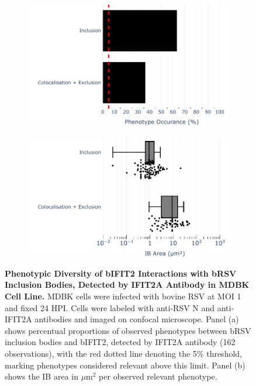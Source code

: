 \begin{figure}
    \begin{subfigure}{0.495\textwidth}
        \caption{}
        \includegraphics[width=1\linewidth]{08. Chapter 3/Figs/02. Infection/02. IFIT2/01. IFIT2A/13. bar_i2a_mdbk.pdf} 
    \end{subfigure}
    \begin{subfigure}{0.495\textwidth}
        \caption{}
        \includegraphics[width=1\linewidth]{08. Chapter 3/Figs/02. Infection/02. IFIT2/01. IFIT2A/14. box_i2a_mdbk.pdf}
    \end{subfigure}
    \caption[Phenotypic Diversity of bIFIT2 Interactions with bRSV Inclusion Bodies, Detected by IFIT2A Antibody in MDBK Cell Line.]{\textbf{Phenotypic Diversity of bIFIT2 Interactions with bRSV Inclusion Bodies, Detected by IFIT2A Antibody in MDBK Cell Line.} MDBK cells were infected with bovine RSV at MOI 1 and fixed 24 HPI. Cells were labeled with anti-RSV N and anti-IFIT2A antibodies and imaged on confocal microscope. Panel (a) shows percentual proportions of observed phenotypes between bRSV inclusion bodies and bIFIT2, detected by IFIT2A antibody (162 observations), with the red dotted line denoting the 5\% threshold, marking phenotypes considered relevant above this limit. Panel (b) shows the IB area in \(\mu \mbox{m}^2\) per observed relevant phenotype.}
    \label{fig:Phenotypic Diversity of bIFIT2 Interactions with bRSV Inclusion Bodies, Detected by IFIT2A Antibody in MDBK Cell Line}
\end{figure}

